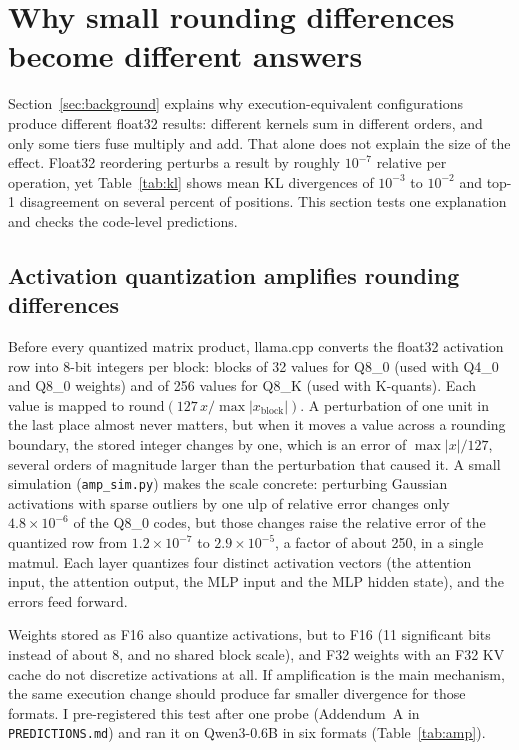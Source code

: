 \section{Why small rounding differences become different answers}
\label{sec:mechanism}

Section~\ref{sec:background} explains why execution-equivalent configurations produce different
float32 results: different kernels sum in different orders, and only some tiers fuse multiply
and add. That alone does not explain the size of the effect. Float32 reordering perturbs a
result by roughly $10^{-7}$ relative per operation, yet Table~\ref{tab:kl} shows mean KL
divergences of $10^{-3}$ to $10^{-2}$ and top-1 disagreement on several percent of positions.
This section tests one explanation and checks the code-level predictions.

\subsection{Activation quantization amplifies rounding differences}
Before every quantized matrix product, llama.cpp converts the float32 activation row into 8-bit
integers per block: blocks of 32 values for Q8\_0 (used with Q4\_0 and Q8\_0 weights) and of 256
values for Q8\_K (used with K-quants). Each value is mapped to
$\mathrm{round}(127\,x/\max|x_{\text{block}}|)$. A perturbation of one unit in the last place
almost never matters, but when it moves a value across a rounding boundary, the stored integer
changes by one, which is an error of $\max|x|/127$, several orders of magnitude larger than the
perturbation that caused it. A small simulation (\texttt{amp\_sim.py}) makes the scale concrete:
perturbing Gaussian activations with sparse outliers by one ulp of relative error changes only
$4.8\times10^{-6}$ of the Q8\_0 codes, but those changes raise the relative error of the
quantized row from $1.2\times10^{-7}$ to $2.9\times10^{-5}$, a factor of about 250, in a single
matmul. Each layer quantizes four distinct activation vectors (the attention input, the attention
output, the MLP input and the MLP hidden state), and the errors feed forward.

Weights stored as F16 also quantize activations, but to F16 (11 significant bits instead of
about 8, and no shared block scale), and F32 weights with an F32 KV cache do not discretize
activations at all. If amplification is the main mechanism, the same execution change should
produce far smaller divergence for those formats. I pre-registered this test after one probe
(Addendum~A in \texttt{PREDICTIONS.md}) and ran it on Qwen3-0.6B in six formats
(Table~\ref{tab:amp}).

